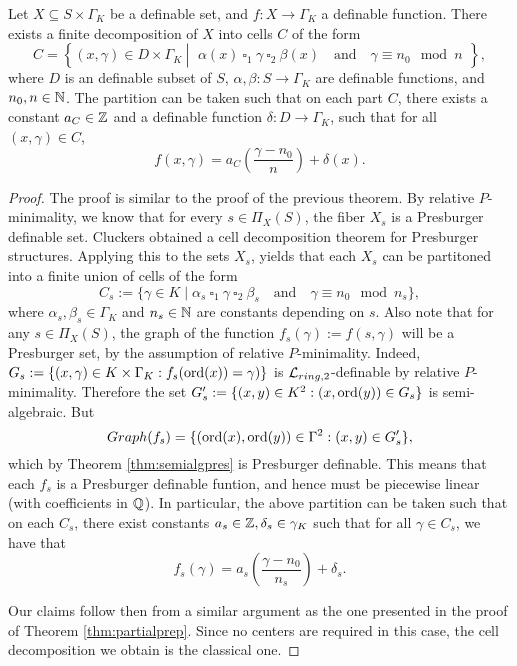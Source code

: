 \begin{prop}\label{prop:partialcd2}
Let $X \subseteq S \times \Gamma_K$ be a definable set, and $f: X \to \Gamma_K$ a definable function. There exists a finite decomposition of $X$ into cells $C$ of the form
\[C = \left\{(x,\gamma) \in D \times \Gamma_K \ \left| \ \begin{array}{l}\alpha(x)\ \square_1 \ \gamma \ \square_2 \  \beta(x)\quad \text{and}\quad \gamma \equiv n_0 \mod n \end{array} \right\}\right.,\]
where $D$ is an definable subset of $S$, $\alpha, \beta: S \to \Gamma_K$ are definable functions, and $n_0,n \in {\mathbb N}$. The partition can be taken such that on each part $C$, there exists a constant $a_{C} \in {\mathbb Z}$ and a definable function $\delta: D \to \Gamma_K$, such that for all $(x,\gamma) \in C$,
\[f(x,\gamma) = a_C \left(\frac{\gamma -n_0}{n}\right) + \delta(x).\]
 \end{prop}
\begin{proof}
The proof is similar to the proof of the previous theorem. By relative $P$-minimality, we know that for every $s \in \Pi_X(S)$, the fiber $X_s$ is a Presburger definable set. Cluckers \cite{clu-presb03} obtained a cell decomposition theorem for Presburger structures. Applying this to the sets $X_s$, yields that each
 $X_s$ can be partitoned into a finite union of cells of the form
\[C_s := \{ \gamma \in K \mid  \alpha_s\ \square_1 \ \gamma \ \square_2 \  \beta_s\quad \text{and}\quad \gamma \equiv n_0 \mod n_s\},\]
where $\alpha_s, \beta_s \in \Gamma_K$ and $n_s \in {\mathbb N}$ are constants depending on $s$. Also note that for any $s \in \Pi_X(S)$, the graph of the function $f_s(\gamma):= f(s,\gamma)$ will be a Presburger set, by the assumption of relative $P$-minimality. Indeed, $G_s:=\{(x,\gamma)\in K\times \Gamma_K: f_s(\operatorname{ord}(x))=\gamma)\}$ is $\mathcal{L}_{ring,2}$-definable by relative $P$-minimality. Therefore the set $G_s':=\{(x,y)\in K^2: (x,\operatorname{ord}(y))\in G_s\}$ is semi-algebraic. But 
\[Graph(f_s)=\{(\operatorname{ord}(x),\operatorname{ord}(y))\in \Gamma^2: (x,y)\in G_s'\},\]
which by Theorem \ref{thm:semialgpres} is Presburger definable. This means that each $f_s$ is a Presburger definable funtion, and hence  must be piecewise linear (with coefficients in ${\mathbb Q}$). In particular, the above partition can be taken such that on each $C_s$, there exist constants $a_s \in {\mathbb Z}, \delta_s \in \gamma_K$ such that for all $\gamma \in C_s$, we have that
\[f_s(\gamma) = a_s \left(\frac{\gamma -n_0}{n_s}\right) + \delta_s.\]

Our claims follow then from a similar argument as the one presented in the proof of Theorem
\ref{thm:partialprep}. Since no centers are required in this case, the cell decomposition we obtain is the classical one.
\end{proof}


